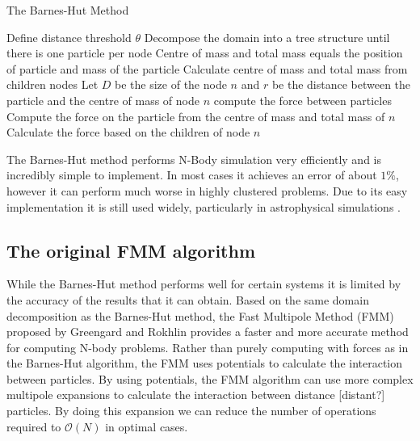 \begin{algorithm}[ht]
\caption{The Barnes-Hut Method}\label{alg:BarnesHut}
\begin{algorithmic}
\State Define distance threshold $\theta$
\State Decompose the domain into a tree structure until there is one particle per node
\State Centre of mass and total mass equals the position of particle and mass of the particle
\Else 
\State Calculate centre of mass and total mass from children nodes
\EndIf
\EndFor
{}
\State Let $D$ be the size of the node $n$ and $r$ be the distance between the particle and the centre of mass of node $n$
\State compute the force between particles 
\Else
{}
\State Compute the force on the particle from the centre of mass and total mass of 
\State $n$
\Else
\State Calculate the force based on the children of node $n$
\EndIf
\EndIf
\EndFor
\end{algorithmic}
\end{algorithm}

The Barnes-Hut method performs N-Body simulation very efficiently and is incredibly simple to implement. In most cases it achieves an error of about $1\%$, however it can perform much worse in highly clustered problems. Due to its easy implementation it is still used widely, particularly in astrophysical simulations \cite{Gaburov2010,Capuzzo-DolcettaIstitutoAstronomico,Ishiyama20124.45Problem,Iwasawa2019ImplementationC,Rein2013Large-scaleRings}.

\subsection{The original FMM algorithm}
While the Barnes-Hut method performs well for certain systems it is limited by the accuracy of the results that it can obtain. Based on the same domain decomposition as the Barnes-Hut method, the Fast Multipole Method (FMM) proposed by Greengard and Rokhlin \cite{1988The0-262-7110-X.,Rokhlin1985RapidTheory,Greengard1987ASimulations} provides a faster and more accurate method for computing N-body problems. Rather than purely computing with forces as in the Barnes-Hut algorithm, the FMM uses potentials to calculate the interaction between particles. By using potentials, the FMM algorithm can use more complex multipole expansions to calculate the interaction between distance [distant?] particles. By doing this expansion we can reduce the number of operations required to $\mathcal{O}(N)$ in optimal cases.

